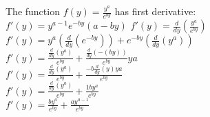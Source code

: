 \documentclass[]{article}
\begin{document}
The function \(f(y) = \frac{y^a}{e^{by}}\) has first derivative:\\
\(f'(y) = y^{a-1}e^{-by}(a-by)\)
\(f'(y) = \frac{d}{dy}(\frac{y^a}{e^{by}})\)\\
\(f'(y) = y^a(\frac{d}{dy}(e^{-by})) + e^{-by}(\frac{d}{dy}(y^a))\)\\
\(f'(y) = \frac{\frac{d}{dy}(y^a)}{e^{by}} + \frac{\frac{d}{dy}(-(by))}{e^{by}}ya\)\\
\(f'(y) = \frac{\frac{d}{dy}(y^a)}{e^{by}} + \frac{-b\frac{d}{dy}(y)ya}{e^{by}}\)\\
\(f'(y) = \frac{\frac{d}{dy}(y^a)}{e^{by}} + \frac{1by^a}{e^{by}}\)\\
\(f'(y) = \frac{by^a}{e^{by}} + \frac{ay^{a-1}}{e^{by}}\)
\end{document}
